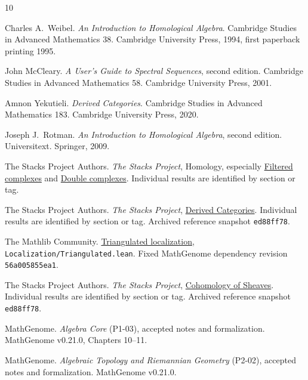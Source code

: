 \documentclass[11pt,oneside,openany]{book}
\theoremstyle{definition}
\theoremstyle{remark}
\begin{document}
\backmatter
\begin{thebibliography}{10}

Charles A.~Weibel.
\emph{An Introduction to Homological Algebra}.
Cambridge Studies in Advanced Mathematics 38.
Cambridge University Press, 1994, first paperback printing 1995.

John McCleary.
\emph{A User's Guide to Spectral Sequences}, second edition.
Cambridge Studies in Advanced Mathematics 58.
Cambridge University Press, 2001.

Amnon Yekutieli.
\emph{Derived Categories}.
Cambridge Studies in Advanced Mathematics 183.
Cambridge University Press, 2020.

Joseph J.~Rotman.
\emph{An Introduction to Homological Algebra}, second edition.
Universitext. Springer, 2009.

The Stacks Project Authors.
\emph{The Stacks Project}, Homology, especially
\href{https://stacks.math.columbia.edu/tag/012K}{Filtered complexes}
and \href{https://stacks.math.columbia.edu/tag/012X}{Double complexes}.
Individual results are identified by section or tag.

The Stacks Project Authors.
\emph{The Stacks Project}, \href{https://stacks.math.columbia.edu/tag/05QI}{Derived Categories}.
Individual results are identified by section or tag.
Archived reference snapshot \texttt{ed88ff78}.

The Mathlib Community.
\href{https://github.com/leanprover-community/mathlib4/blob/56a005855ea17e0b0958f73ec801ae140b0a1679/Mathlib/CategoryTheory/Localization/Triangulated.lean}{Triangulated localization},
\texttt{Localization/Triangulated.lean}.
Fixed MathGenome dependency revision \texttt{56a005855ea1}.

The Stacks Project Authors.
\emph{The Stacks Project}, \href{https://stacks.math.columbia.edu/tag/01DW}{Cohomology of Sheaves}.
Individual results are identified by section or tag.
Archived reference snapshot \texttt{ed88ff78}.

MathGenome.
\emph{Algebra Core} (P1-03), accepted notes and formalization.
MathGenome v0.21.0, Chapters 10--11.

MathGenome.
\emph{Algebraic Topology and Riemannian Geometry} (P2-02),
accepted notes and formalization. MathGenome v0.21.0.
\end{thebibliography}
\end{document}
